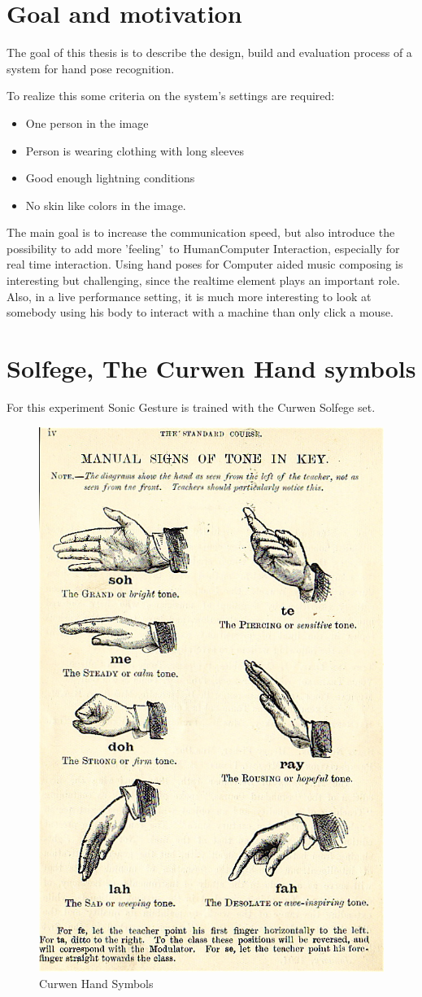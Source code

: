 \section{Goal and motivation}
The goal of this thesis is to describe the design, build and evaluation process of a system for hand pose recognition.

To realize this some criteria on the system's settings are required:
\begin{itemize}
	\item One person in the image
	\item Person is wearing clothing with long sleeves
	\item Good enough lightning conditions
	\item No skin like colors in the image.
\end{itemize}

The main goal is to increase the communication speed, but also introduce the possibility to add more 'feeling' to Human\-Computer Interaction, especially for real time interaction. Using hand poses for Computer aided music composing is interesting but challenging, since the realtime element plays an important role. Also, in a live performance setting, it is much more interesting to look at somebody using his body to interact with a machine than only click a mouse.


\section{Solfege, The Curwen Hand symbols}

For this experiment Sonic Gesture is trained with the Curwen Solfege set\cite{choksy1999}.


\begin{figure}[h]

	\label{fig:curwen}
	\includegraphics[width=0.3\linewidth]{figures/curwen.jpg}
	\caption{Curwen Hand Symbols}
\end{figure}

